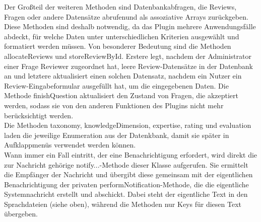 \documentclass[a4paper]{scrreprt}
\begin{document}
Der Großteil der weiteren Methoden sind Datenbankabfragen, die Reviews, Fragen oder andere Datensätze abrufenund als assoziative Arrays zurückgeben. Diese Methoden sind deshalb notwendig, da das Plugin mehrere Anwendungsfälle abdeckt, für welche Daten unter unterschiedlichen Kriterien ausgewählt und formatiert werden müssen. Von besonderer Bedeutung sind die Methoden allocateReviews und storeReviewById. Erstere legt, nachdem der Administrator einer Frage Reviewer zugeordnet hat, leere Review-Datensätze in der Datenbank an und letztere aktualisiert einen solchen Datensatz, nachdem ein Nutzer ein Review-Eingabeformular ausgefüllt hat, um die eingegebenen Daten. Die Methode finishQuestion aktualisiert den Zustand von Fragen, die akzeptiert werden, sodass sie von den anderen Funktionen des Plugins nicht mehr berücksichtigt werden.\\
Die Methoden taxonomy, knowledgeDimension, expertise, rating und evaluation laden die jeweilige Enumeration aus der Datenkbank, damit sie später in Aufklappmenüs verwendet werden können.\\
Wann immer ein Fall eintritt, der eine Benachrichtigung erfordert, wird direkt die zur Nachricht gehörige notify...-Methode dieser Klasse aufgerufen. Sie ermittelt die Empfänger der Nachricht und übergibt diese gemeinsam mit der eigentlichen Benachrichtigung der privaten performNotification-Methode, die die eigentliche Systemnachricht erstellt und abschickt. Dabei steht der eigentliche Text in den Sprachdateien (siehe oben), während die Methoden nur Keys für diesen Text übergeben.
\end{document}
